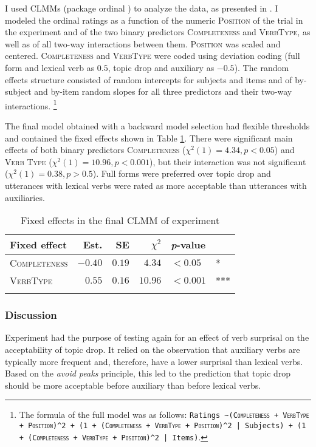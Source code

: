 I used CLMMs (package ordinal \citep{christensen2019}) to analyze the data, as presented in .
I modeled the ordinal ratings as a function of the numeric \textsc{Position} of the trial in the experiment and of the two binary predictors \textsc{Completeness} and \textsc{VerbType}, as well as of all two-way interactions between them.
\textsc{Position} was scaled and centered.
\textsc{Completeness} and \textsc{VerbType} were coded using deviation coding (full form and lexical verb as $0.5$, topic drop and auxiliary as $-0.5$).
The random effects structure consisted of random intercepts for subjects and items and of by-subject and by-item random slopes for all three predictors and their two-way interactions.%
\footnote{The formula of the full model was as follows: \texttt{Ratings \textasciitilde (\textsc{Completeness} + \textsc{VerbType} + \textsc{Position})\textasciicircum2 + (1 + (\textsc{Completeness} + \textsc{VerbType} + \textsc{Position})\textasciicircum2 | Subjects) + (1 + (\textsc{Completeness} + \textsc{VerbType} + \textsc{Position})\textasciicircum2 | Items)}.}

The final model obtained with a backward model selection had flexible thresholds and contained the fixed effects shown in Table \ref{tab:model.exp.vs.vt}.
There were significant main effects of both binary predictors \textsc{Completeness} ($\chi^2(1) = 4.34, p < 0.05$) and \textsc{Verb Type} ($\chi^2(1) = 10.96, p < 0.001$), but their interaction was not significant ($\chi^2(1) = 0.38, p > 0.5 $).
Full forms were preferred over topic drop and utterances with lexical verbs were rated as more acceptable than utterances with auxiliaries.

\begin{table}
\caption{Fixed effects in the final CLMM of experiment }
\centering
\begin{tabular}{lrrrll}
\lsptoprule
Fixed effect & Est. & SE & $\chi^2$ & \textit{p}-value &   \\
\midrule
\textsc{Completeness} & $-0.40$ & $0.19$ & $4.34$ & $< 0.05$ & * \\
\textsc{VerbType} & $0.55$ & $0.16$ & $10.96$ & $< 0.001$ & ***\\
\lspbottomrule
\end{tabular}
\label{tab:model.exp.vs.vt}
\end{table}

\subsubsection{Discussion}
Experiment  had the purpose of testing again for an effect of verb surprisal on the acceptability of topic drop.
It relied on the observation that auxiliary verbs are typically more frequent and, therefore, have a lower surprisal than lexical verbs.
Based on the \textit{avoid peaks} principle, this led to the prediction that topic drop should be more acceptable before auxiliary than before lexical verbs.

